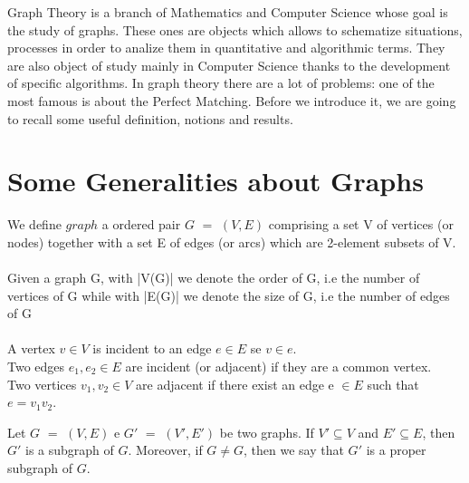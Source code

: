 Graph Theory is a branch of Mathematics and Computer Science whose goal is the study of graphs. These ones are objects which allows to schematize situations, processes in order to analize them in quantitative and algorithmic terms. They are also object of study mainly in Computer Science thanks to the development of specific algorithms. In graph theory there are a lot of problems: one of the most famous is about the Perfect Matching. Before we introduce it, we are going to recall some useful definition, notions and results.

\section{Some Generalities about Graphs}
\begin{definition}
We define $graph$ a ordered pair $G$ $=$ $(V,E)$ comprising a set V of vertices (or nodes) together with a set E of edges (or arcs) which are 2-element subsets of V.\\
\\
Given a graph G, with |V(G)| we denote the order of G, i.e the number of vertices of G while with |E(G)| we denote the size of G, i.e the number of edges of G\\
\\
A vertex $v \in V$ is incident to an edge $e \in E$ se $v \in e$.\\
Two edges $e_{1}, e_{2} \in E$ are incident (or adjacent) if they are a common vertex.\\
Two vertices $v_{1}, v_{2} \in V$ are adjacent if there exist an edge e $\in E$ such that $e=v_{1}v_{2}$.
\end{definition}

\begin{definition}
Let $G$ $=$ $(V,E)$ e $G'$ $=$ $(V',E')$ be two graphs. If $V'\subseteq V$ and $E'\subseteq E$, then $G'$ is a subgraph of $G$.
Moreover, if $G\ne G$, then we say that $G'$ is a proper subgraph of $G$.
\end{definition}

